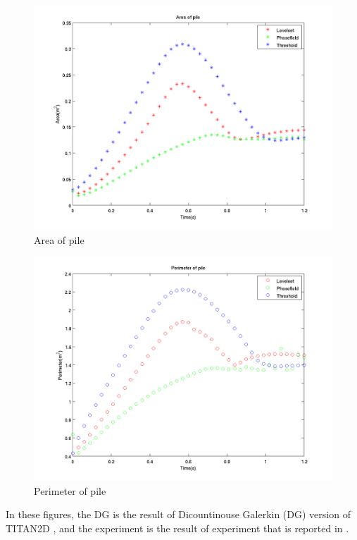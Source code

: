\documentclass[letterpaper,10pt]{article}
\begin{document}
\begin{figure}[H]
\centerline{\includegraphics[scale=0.5]{IMAGES/area.png}}
\caption{Area of pile}
\label{wet_area}
\end{figure}

\begin{figure}[H]
\centerline{\includegraphics[scale=0.5]{IMAGES/perimeter.png}}
\caption{Perimeter of pile}
\label{wet_peram}
\end{figure}

In these figures, the DG is the result of Dicountinouse Galerkin (DG) version of TITAN2D \cite{}, and the experiment is the result of experiment 
that is reported in \cite{}.


\end{document}
